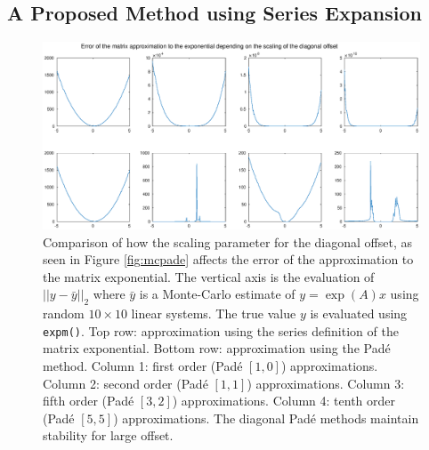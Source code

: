 \subsection{A Proposed Method using Series Expansion}

\begin{figure}
    \centering
    \includegraphics[width=\linewidth]{Matlab/padevsserieserr.eps}
    \caption{
        Comparison of how the scaling parameter for the diagonal offset, as seen in Figure \ref{fig:mcpade} affects the error of the approximation to the matrix exponential.
        The vertical axis is the evaluation of $||y-\bar{y}||_2$ where $\bar{y}$ is a Monte-Carlo estimate of $y = \exp(A)x$ using random $10 \times 10$ linear systems.
        The true value $y$ is evaluated using \texttt{expm()}.
        Top row: approximation using the series definition of the matrix exponential.
        Bottom row: approximation using the Pad\'e method.
        Column 1: first order (Pad\'e $[1,0]$) approximations.
        Column 2: second order (Pad\'e $[1,1]$) approximations.
        Column 3: fifth order (Pad\'e $[3,2]$) approximations.
        Column 4: tenth order (Pad\'e $[5,5]$) approximations.
        The diagonal Pad\'e methods maintain stability for large offset.
    }
    \label{fig:padeserieserr}
\end{figure}

